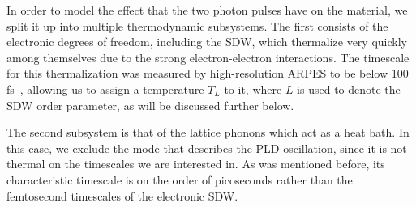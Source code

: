 
In order to model the effect that the two photon pulses have on the material, we split it up into multiple thermodynamic subsystems.
The first consists of the electronic degrees of freedom, including the SDW, which thermalize very quickly among themselves due to the strong electron-electron interactions.
The timescale for this thermalization was measured by high-resolution ARPES to be below 100 fs~\cite{Nicholson2016}, allowing us to assign a temperature $T_L$ to it, where $L$ is used to denote the SDW order parameter, as will be discussed further below.

The second subsystem is that of the lattice phonons which act as a heat bath.
In this case, we exclude the mode that describes the PLD oscillation, since it is not thermal on the timescales we are interested in. As was mentioned before, its characteristic timescale is on the order of picoseconds rather than the femtosecond timescales of the electronic SDW.

